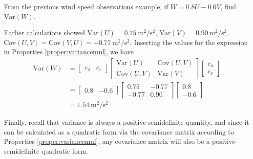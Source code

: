 \begin{exmp}
From the previous wind speed observations example, if $W = 0.8U-0.6V$, find $\text{Var}(W)$.
\end{exmp}
\begin{solution}
Earlier calculations showed $\text{Var}(U) = \SI{0.75}{\square\m \per \square\s}$,
$\text{Var}(V) = \SI{0.90}{\square\m \per \square\s}$, $\text{Cov}(U,V) = \text{Cov}(V,U) = \SI{-0.77}{\square\m \per \square\s}$. Inserting the values for the expression in Properties \ref{proper:variancemul}, we have
\begin{align*}
\text{Var}(W) &=
\begin{bmatrix}
c_u & c_v
\end{bmatrix}
\begin{bmatrix}
\text{Var}(U) & \text{Cov}(U,V) \\
\text{Cov}(U,V) & \text{Var}(V)
\end{bmatrix}
\begin{bmatrix}
c_u \\
c_v
\end{bmatrix} \\
&=
\begin{bmatrix}
0.8 & -0.6
\end{bmatrix}
\begin{bmatrix}
0.75 & -0.77 \\
-0.77 & 0.90
\end{bmatrix}
\begin{bmatrix}
0.8 \\
-0.6
\end{bmatrix} \\
&= \SI{1.54}{\square\m \per \square\s}
\end{align*} 
\end{solution}
Finally, recall that variance is always a positive-semidefinite quantity, and since it can be calculated as a quadratic form via the covariance matrix according to Properties \ref{proper:variancemul}, any covariance matrix will also be a positive-semidefinite quadratic form.

